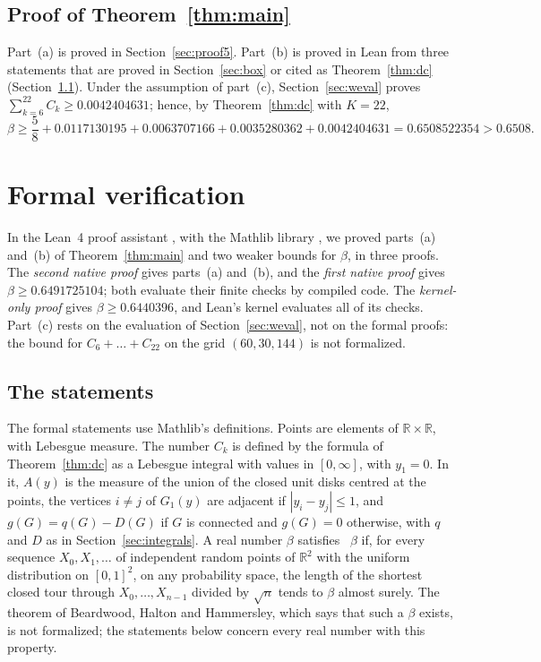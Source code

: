 \documentclass[11pt]{amsart}
\theoremstyle{definition}
\theoremstyle{remark}
\numberwithin{equation}{section}
\newcommand{\lean}[1]{\texttt{\detokenize{#1}}}
\newcommand{\R}{\mathbb{R}}
\newcommand{\CThree}{0.0117130195}
\newcommand{\CFour}{0.0063707166}
\newcommand{\CFive}{0.0035280362}
\newcommand{\WindowThree}{0.0042404631}%
\newcommand{\KmaxW}{22}
\newcommand{\WNone}{60}\newcommand{\WNtwo}{30}\newcommand{\WNt}{144}%
\newcommand{\LeanNbound}{0.6491725104}%
\newcommand{\LeanKbound}{0.6440396}%
\newcommand{\LBMAIN}{0.6508}
\newcommand{\SumBound}{0.6508522354}%
\newcommand{\Kmax}{\KmaxW}
\newcommand{\LargeSum}{\WindowThree}
\begin{document}
\subsection{Proof of Theorem~\ref{thm:main}}
Part~(a) is proved in Section~\ref{sec:proof5}. Part~(b) is proved in Lean from three statements that are proved in Section~\ref{sec:box} or cited as Theorem~\ref{thm:dc} (Section~\ref{sec:leanstat}). Under the assumption of part~(c), Section~\ref{sec:weval} proves $\sum_{k=6}^{\Kmax}C_k\ge\LargeSum$; hence, by Theorem~\ref{thm:dc} with $K=\Kmax$,
\[
\beta\ge\frac58+\CThree+\CFour+\CFive+\LargeSum=\SumBound>\LBMAIN.
\]

\section{Formal verification}\label{sec:lean}

In the Lean~4 proof assistant \cite{Lean4}, with the Mathlib library \cite{Mathlib}, we proved parts~(a) and~(b) of Theorem~\ref{thm:main} and two weaker bounds for $\beta$, in three proofs. The \emph{second native proof} gives parts~(a) and~(b), and the \emph{first native proof} gives $\beta\ge\LeanNbound$; both evaluate their finite checks by compiled code. The \emph{kernel-only proof} gives $\beta\ge\LeanKbound$, and Lean's kernel evaluates all of its checks. Part~(c) rests on the evaluation of Section~\ref{sec:weval}, not on the formal proofs: the bound for $C_6+\dots+C_{\Kmax}$ on the grid $(\WNone,\WNtwo,\WNt)$ is not formalized.

\subsection{The statements}\label{sec:leanstat}
The formal statements use Mathlib's definitions. Points are elements of $\R\times\R$, with Lebesgue measure. The number $C_k$ is defined by the formula of Theorem~\ref{thm:dc} as a Lebesgue integral with values in $[0,\infty]$, with $y_1=0$. In it, $A(y)$ is the measure of the union of the closed unit disks centred at the points, the vertices $i\ne j$ of $G_1(y)$ are adjacent if $|y_i-y_j|\le1$, and $g(G)=q(G)-D(G)$ if $G$ is connected and $g(G)=0$ otherwise, with $q$ and $D$ as in Section~\ref{sec:integrals}. A real number $\beta$ satisfies \lean{IsBHHConstant}~$\beta$ if, for every sequence $X_0,X_1,\dots$ of independent random points of $\R^2$ with the uniform distribution on $[0,1]^2$, on any probability space, the length of the shortest closed tour through $X_0,\dots,X_{n-1}$ divided by $\sqrt n$ tends to $\beta$ almost surely. The theorem of Beardwood, Halton and Hammersley, which says that such a $\beta$ exists, is not formalized; the statements below concern every real number with this property.
\end{document}
